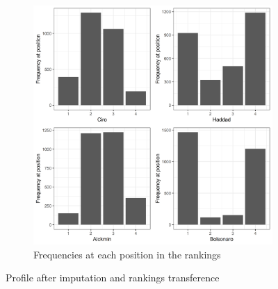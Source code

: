 \documentclass[hidelinks,11pt]{article} \usepackage[utf8]{inputenc}
\begin{document}
\begin{figure}[!h]
\begin{subfigure}[b]{0.8\textwidth}
\includegraphics[width=\textwidth]{./images/corrected1_indexes_plot.png}
 \caption{Frequencies at each position in the rankings}
 \label{fig:counts}
\end{subfigure}
\caption{Profile after imputation and rankings transference}
\label{fig:profile_trans}
\end{figure}
\end{document}
